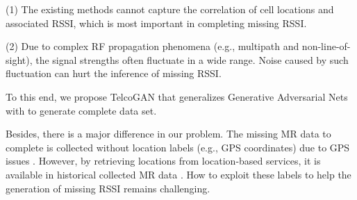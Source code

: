 (1) The existing methods cannot capture the correlation of cell locations and associated RSSI, which is most important in completing missing RSSI.

(2) Due to complex RF propagation phenomena (e.g., multipath and non-line-of-sight), the signal strengths often fluctuate in a wide range. Noise caused by such fluctuation can hurt the inference of missing RSSI.

To this end, we propose TelcoGAN that generalizes Generative Adversarial Nets \cite{DBLP:conf/nips/GoodfellowPMXWOCB14} with  to generate complete data set.

Besides, there is a major difference in our problem. The missing MR data to complete is collected without location labels (e.g., GPS coordinates) due to GPS issues \cite{DBLP:conf/mdm/ZhangRYZY17}. However, by retrieving locations from location-based services, it is available in historical collected MR data \cite{DBLP:journals/imwut/HuangLWCXZ17}. How to exploit these labels to help the generation of missing RSSI remains challenging. 